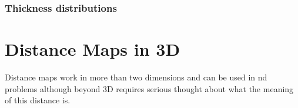 \documentclass[letterpaper,10pt,english]{sphinxmanual}
\begin{document}
\subsection{Thickness distributions}
\label{\detokenize{06-AdvancedShapeAndTexture:thickness-distributions}}
\begin{sphinxVerbatim}[commandchars=\\\{\}]
        

\PYG{p}{[}  \PYG{p}{]}  
\PYG{p}{[}  \PYG{p}{]}  
\end{sphinxVerbatim}

\noindent{}


\chapter{Distance Maps in 3D}
\label{\detokenize{06-AdvancedShapeAndTexture:distance-maps-in-3d}}
\sphinxAtStartPar
Distance maps work in more than two dimensions and can be used in n\sphinxhyphen{}d problems although beyond 3D requires serious thought about what the meaning of this distance is.
\end{document}
